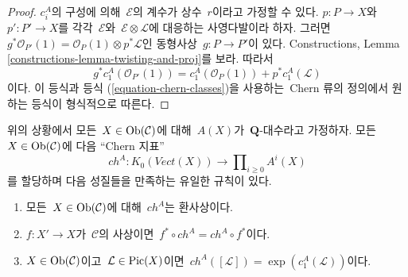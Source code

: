 \begin{proof}
$c^A_i$의 구성에 의해\  $\mathcal{E}$의 계수가 상수\  $r$이라고
가정할 수 있다. $p : P \to X$와\  $p' : P' \to X$를 각각\ 
$\mathcal{E}$와\  $\mathcal{E} \otimes \mathcal{L}$에 대응하는
사영다발이라 하자. 그러면\ 
$g^*\mathcal{O}_{P'}(1) = \mathcal{O}_P(1) \otimes p^*\mathcal{L}$인
동형사상\  $g : P \to P'$이 있다. Constructions, Lemma
\ref{constructions-lemma-twisting-and-proj}를 보라. 따라서
$$
g^*c_1^A(\mathcal{O}_{P'}(1)) =
c_1^A(\mathcal{O}_P(1)) + p^*c_1^A(\mathcal{L})
$$
이다. 이 등식과 등식 (\ref{equation-chern-classes})을 사용하는\ 
Chern 류의 정의에서 원하는 등식이 형식적으로 따른다.
\end{proof}

\begin{proposition}
\label{proposition-chern-character}
위의 상황에서 모든\  $X \in \mathop{\mathrm{Ob}}\nolimits(\mathcal{C})$에 대해\  $A(X)$가\ 
$\mathbf{Q}$-대수라고 가정하자. 모든\  $X \in \mathop{\mathrm{Ob}}\nolimits(\mathcal{C})$에
다음 “Chern 지표”
$$
ch^A : K_0(\textit{Vect}(X)) \longrightarrow
\prod\nolimits_{i \geq 0} A^i(X)
$$
를 할당하며 다음 성질들을 만족하는 유일한 규칙이 있다.
\begin{enumerate}
\item 모든\  $X \in \mathop{\mathrm{Ob}}\nolimits(\mathcal{C})$에 대해\  $ch^A$는 환사상이다.
\item $f : X' \to X$가\  $\mathcal{C}$의 사상이면\ 
$f^* \circ ch^A =  ch^A \circ f^*$이다.
\item $X \in \mathop{\mathrm{Ob}}\nolimits(\mathcal{C})$이고\  $\mathcal{L} \in \mathop{\mathrm{Pic}}\nolimits(X)$이면\ 
$ch^A([\mathcal{L}]) = \exp(c_1^A(\mathcal{L}))$이다.
\end{enumerate}
\end{proposition}

